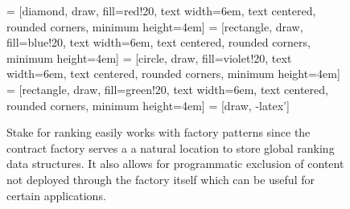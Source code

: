 \begin{figure}[!ht] 
    \centering
     = [diamond, draw, fill=red!20, 
    text width=6em, text centered, rounded corners, minimum height=4em] 
     = [rectangle, draw, fill=blue!20, 
    text width=6em, text centered, rounded corners, minimum height=4em]
     = [circle, draw, fill=violet!20, 
        text width=6em, text centered, rounded corners, minimum height=4em]
     = [rectangle, draw, fill=green!20, 
        text width=6em, text centered, rounded corners, minimum height=4em]
     = [draw, -latex']
    
    \caption{Stake for ranking easily works with factory patterns since the contract factory serves a a natural location to store global ranking data structures. It also allows for programmatic exclusion of content not deployed through the factory itself which can be useful for certain applications.}
    \label{fig:FactoryRanking}
  \end{figure}